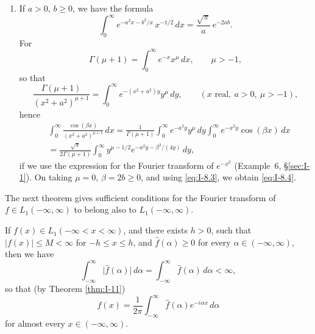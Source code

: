 \begin{enumerate}[label=\arabic*.,ref=\arabic*]
\item If $a>0$, $b\ge 0$, we have the formula
\begin{equation}\label{eq:I-8.4}\tag{8.4}
\int_{0}^{\infty}e^{-a^{2}x-b^{2}/x}\,x^{-1/2}\,dx=\frac{\sqrt{\pi}}{a}\,e^{-2ab}.
\end{equation}
For
\begin{equation*}
\Gamma(\mu+1)=\int_{0}^{\infty}e^{-x}x^{\mu}\,dx,\qquad\mu>-1,
\end{equation*}
so that
\begin{equation*}
\frac{\Gamma(\mu+1)}{(x^{2}+a^{2})^{\mu+1}}
=\int_{0}^{\infty}e^{-(x^{2}+a^{2})y}y^{\mu}\,dy,\qquad(x\text{ real},\ a>0,\ \mu>-1),
\end{equation*}
hence
\begin{equation*}
\begin{aligned}
&\int_{0}^{\infty}\frac{\cos(\beta x)}{(x^{2}+a^{2})^{\mu+1}}\,dx = \frac{1}{\Gamma(\mu+1)}\int_{0}^{\infty}e^{-a^{2}y}y^{\mu}\,dy\int_{0}^{\infty}e^{-x^{2}y}\cos(\beta x)\,dx\\
&= \frac{\sqrt{\pi}}{2\Gamma(\mu+1)}\int_{0}^{\infty}y^{\mu-1/2}e^{-a^{2}y-\beta^{2}/(4y)}\,dy,
\end{aligned}
\end{equation*}
if we use the expression for the Fourier transform of $e^{-x^{2}}$ (Example~6, \S\ref{sec:I-1}). On taking $\mu=0$, $\beta=2b\ge 0$, and using \eqref{eq:I-8.3}, we obtain \eqref{eq:I-8.4}.
\end{enumerate}

The next theorem gives sufficient conditions for the Fourier transform of $f\in L_1(-\infty,\infty)$ to belong also to $L_1(-\infty,\infty)$.

\begin{theorem}\label{thm:I-12}
If $f(x)\in L_1(-\infty<x<\infty)$, and there exists $h>0$, such that $|f(x)|\le M<\infty$ for $-h\le x\le h$, and $\widehat f(\alpha)\ge 0$ for every $\alpha\in(-\infty,\infty)$, then we have
\begin{equation*}
\int_{-\infty}^{\infty}\bigl|\widehat f(\alpha)\bigr|\,d\alpha
=\int_{-\infty}^{\infty}\widehat f(\alpha)\,d\alpha<\infty,
\end{equation*}
so that (by Theorem \ref{thm:I-11})
\begin{equation*}
f(x)=\frac{1}{2\pi}\int_{-\infty}^{\infty}\widehat f(\alpha)e^{-i\alpha x}\,d\alpha
\end{equation*}
for almost every $x\in(-\infty,\infty)$.
\end{theorem}

